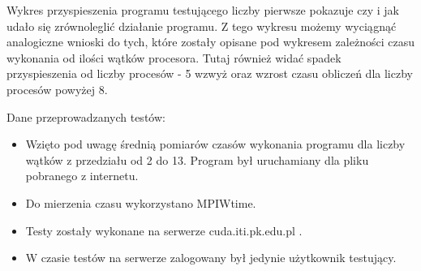 \documentclass[a4paper,12pt]{article}
\newenvironment{lista}{
\begin{itemize}
  \setlength{\itemsep}{1pt}
  \setlength{\parskip}{0pt}
  \setlength{\parsep}{0pt}
}{\end{itemize}}
\begin{document}
Wykres przyspieszenia programu testującego liczby pierwsze pokazuje czy i jak udało się zrównoleglić działanie programu. Z tego wykresu możemy wyciągnąć analogiczne wnioski do tych, które zostały opisane pod wykresem zależności czasu wykonania od ilości wątków procesora. Tutaj również widać spadek przyspieszenia od liczby procesów - 5 wzwyż oraz wzrost czasu obliczeń dla liczby procesów powyżej 8. 
 
Dane przeprowadzanych testów:
\begin{lista}
 \item Wzięto pod uwagę średnią pomiarów czasów wykonania programu dla liczby wątków z przedziału od 2 do 13. 
 Program był uruchamiany dla pliku pobranego z internetu.
 \item Do mierzenia czasu wykorzystano MPIWtime.
 \item Testy zostały wykonane na serwerze cuda.iti.pk.edu.pl . 
 \item W czasie testów na serwerze zalogowany był jedynie użytkownik testujący.
\end{lista}
\end{document}
